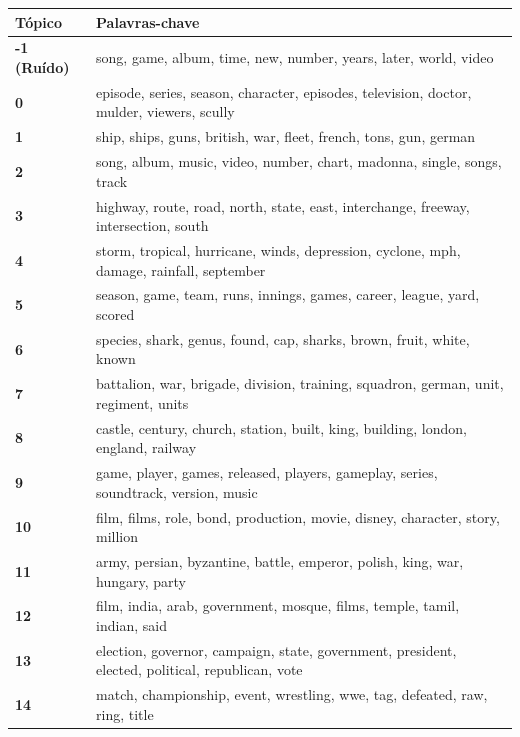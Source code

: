 \begin{table}[htpb]
    \centering
    \scriptsize
    \begin{tabularx}{\textwidth}{@{}l X@{}}
        \toprule
        \textbf{Tópico} & \textbf{Palavras-chave} \\
        \midrule
        \textbf{-1 (Ruído)} & song, game, album, time, new, number, years, later, world, video \\
        \textbf{0} & episode, series, season, character, episodes, television, doctor, mulder, viewers, scully \\
        \textbf{1} & ship, ships, guns, british, war, fleet, french, tons, gun, german \\
        \textbf{2} & song, album, music, video, number, chart, madonna, single, songs, track \\
        \textbf{3} & highway, route, road, north, state, east, interchange, freeway, intersection, south \\
        \textbf{4} & storm, tropical, hurricane, winds, depression, cyclone, mph, damage, rainfall, september \\
        \textbf{5} & season, game, team, runs, innings, games, career, league, yard, scored \\
        \textbf{6} & species, shark, genus, found, cap, sharks, brown, fruit, white, known \\
        \textbf{7} & battalion, war, brigade, division, training, squadron, german, unit, regiment, units \\
        \textbf{8} & castle, century, church, station, built, king, building, london, england, railway \\
        \textbf{9} & game, player, games, released, players, gameplay, series, soundtrack, version, music \\
        \textbf{10} & film, films, role, bond, production, movie, disney, character, story, million \\
        \textbf{11} & army, persian, byzantine, battle, emperor, polish, king, war, hungary, party \\
        \textbf{12} & film, india, arab, government, mosque, films, temple, tamil, indian, said \\
        \textbf{13} & election, governor, campaign, state, government, president, elected, political, republican, vote \\
        \textbf{14} & match, championship, event, wrestling, wwe, tag, defeated, raw, ring, title \\

\end{tabularx}
\end{table}
